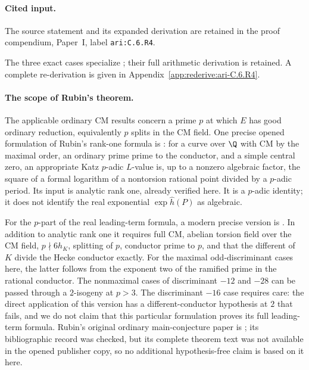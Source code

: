 \paragraph{Cited input.} \label{ari:C.6.R4}The source statement and its expanded derivation are retained in the proof compendium, Paper~I, label \nolinkurl{ari:C.6.R4}.\par



The three exact cases specialize \citet[Theorem~1.2 and Table~9]{miller2011}; their full arithmetic derivation is retained. A complete re-derivation is given in Appendix~\ref{app:rederive:ari-C.6.R4}.


\paragraph{The scope of Rubin's theorem.}
The applicable ordinary CM results concern a prime $p$ at which
$E$ has good ordinary reduction, equivalently $p$ splits in the CM
field. One precise opened formulation of Rubin's rank-one formula
is \citet[Theorem 1]{CrBDP2012}: for a curve over $\Q$ with CM
by the maximal order, an ordinary prime prime to the conductor,
and a simple central zero, an appropriate Katz $p$-adic $L$-value
is, up to a nonzero algebraic factor, the square of a formal
logarithm of a nontorsion rational point divided by a $p$-adic
period. Its input is analytic rank one, already verified here.
It is a $p$-adic identity; it does not identify the real exponential
$\exp\widehat h(P)$ as algebraic.

For the $p$-part of the real leading-term formula, a modern precise
version is \citet[Theorem A]{CrCastella2025}. In addition to analytic
rank one it requires full CM, abelian torsion field over the CM
field, $p\nmid6h_K$, splitting of $p$, conductor prime to $p$,
and that the different of $K$ divide the Hecke conductor exactly.
For the maximal odd-discriminant cases here, the latter follows
from the exponent two of the ramified prime in the rational
conductor. The nonmaximal cases of discriminant $-12$ and $-28$
can be passed through a $2$-isogeny at $p>3$. The discriminant
$-16$ case requires care: the direct application of this version
has a different-conductor hypothesis at $2$ that fails, and we
do not claim that this particular formulation proves its full
leading-term formula. Rubin's original ordinary main-conjecture
paper is \citep{CrRubin1991}; its bibliographic record was checked,
but its complete theorem text was not available in the opened
publisher copy, so no additional hypothesis-free claim is based
on it here.

